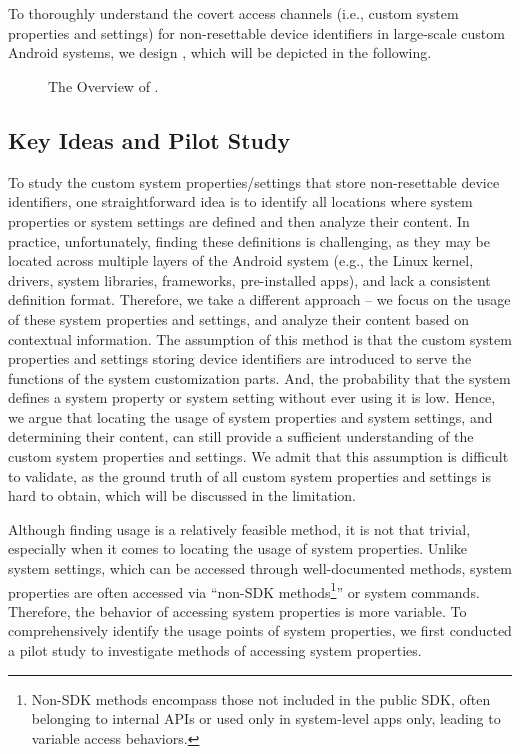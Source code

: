 \section{{\framework}}
\label{sec:approach}
To thoroughly understand the covert access channels (i.e., custom system properties and settings) for non-resettable device identifiers in large-scale custom Android systems, we design {\framework}, which will be depicted in the following.

\begin{figure*}[ht]
  \centering
  \caption{The Overview of {\framework}.}
  \label{fig:approach}
\end{figure*}


\subsection{Key Ideas and Pilot Study}
\label{sec:pilot}

To study the custom system properties/settings that store non-resettable device identifiers, one straightforward idea is to identify all locations where system properties or system settings are defined and then analyze their content.
In practice, unfortunately, finding these definitions is challenging, as they may be located across multiple layers of the Android system (e.g., the Linux kernel, drivers, system libraries, frameworks, pre-installed apps), and lack a consistent definition format.
Therefore, we take a different approach -- 
we focus on the usage of these system properties and settings, and analyze their content based on contextual information.
The assumption of this method is that the custom system properties and settings storing device identifiers are introduced to serve the functions of the system customization parts. 
And, the probability that the system defines a system property or system setting without ever using it is low.
Hence, we argue that locating the usage of system properties and system settings, and determining their content, can still provide a sufficient understanding of the custom system properties and settings.
We admit that this assumption is difficult to validate, as the ground truth of all custom system properties and settings is hard to obtain, which will be discussed in the limitation.

Although finding usage is a relatively feasible method, it is not that trivial, especially when it comes to locating the usage of system properties.
Unlike system settings, which can be accessed through well-documented methods, system properties are often accessed via ``non-SDK methods\footnote{Non-SDK methods encompass those not included in the public SDK, often belonging to internal APIs or used only in system-level apps only, leading to variable access behaviors.}'' or system commands.
Therefore, the behavior of accessing system properties is more variable.
To comprehensively identify the usage points of system properties, we first conducted a pilot study to investigate methods of accessing system properties.

